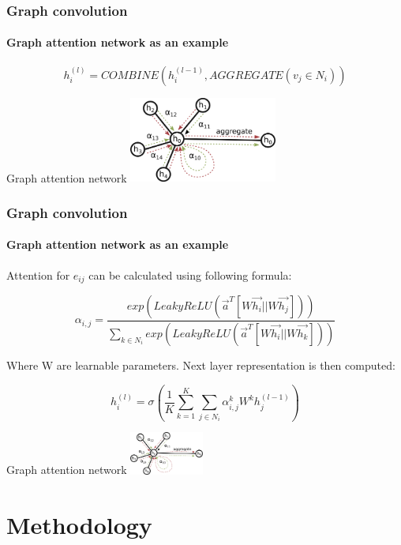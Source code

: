 \documentclass[10pt]{beamer}
\begin{document}
\begin{frame}
    \frametitle{Graph convolution}
    \framesubtitle{Graph attention network as an example}
    \begin{equation}
        h_i^{(l)}=COMBINE(h_i^{(l-1)}, AGGREGATE(v_j\in N_i))
    \end{equation}
    \begin{block}{Graph attention network}
        \centering
        \includegraphics[height=80pt]{figure/attention.png}
    \end{block}
\end{frame}


\begin{frame}
    \frametitle{Graph convolution}
    \framesubtitle{Graph attention network as an example}
    Attention for $e_{ij}$ can be calculated using following formula:

    \begin{equation}
        \alpha_{i,j}=\dfrac{exp(LeakyReLU(\vec{a}^T[W\vec{h_i}||W\vec{h_j}]))}{\sum_{k\in N_i}exp(LeakyReLU(\vec{a}^T[W\vec{h_i}||W\vec{h_k}]))}
    \end{equation}

    Where W are learnable parameters. Next layer representation is then computed:

    \begin{equation}
        h_i^{(l)}=\sigma(\dfrac{1}{K}\sum_{k=1}^{K}\sum_{j\in N_i}{\alpha^k_{i,j}W^kh^{(l-1)}_j})
    \end{equation}

    \begin{block}{Graph attention network}
        \centering
        \includegraphics[height=40pt]{figure/attention.png}
    \end{block}
\end{frame}


\section{Methodology}
\end{document}
